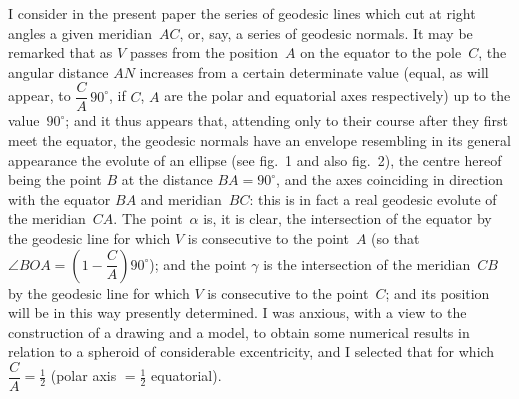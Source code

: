 \documentclass[11pt,a4paper]{article}
\theoremstyle{plain}
\theoremstyle{definition}
\begin{document}
I consider in the present paper the series of geodesic lines which cut at right
angles a given meridian~$AC$, or, say, a series of geodesic normals.  It may be
remarked that as $V$ passes from the position~$A$ on the equator to the pole~$C$, the
angular distance $AN$ increases from a certain determinate value (equal, as will appear,
to $\dfrac{C}{A}\,90^\circ$, if $C$, $A$ are the polar and equatorial axes respectively) up to the value~$90^\circ$;
and it thus appears that, attending only to their course after they first meet the
equator, the geodesic normals have an envelope resembling in its general appearance
the evolute of an ellipse (see fig.~1 and also fig.~2), the centre hereof being the point
$B$ at the distance $BA = 90^\circ$, and the axes coinciding in direction with the equator
$BA$ and meridian~$BC$: this is in fact a real geodesic evolute of the meridian~$CA$.
The point~$\alpha$ is, it is clear, the intersection of the equator by the geodesic line for
which $V$ is consecutive to the point~$A$ (so that $\angle BOA = \left(1 - \dfrac{C}{A}\right)90^\circ$); and the
point $\gamma$ is the intersection of the meridian~$CB$ by the geodesic line for which $V$ is
consecutive to the point~$C$; and its position will be in this way presently determined.
I was anxious, with a view to the construction of a drawing and a model, to obtain
some numerical results in relation to a spheroid of considerable excentricity, and I
selected that for which $\dfrac{C}{A} = \tfrac{1}{2}$ (polar axis $= \tfrac{1}{2}$ equatorial).
\end{document}
